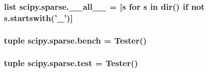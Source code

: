 \subsubsection[{\+\_\+\+\_\+all\+\_\+\+\_\+}]{\setlength{\rightskip}{0pt plus 5cm}list scipy.\+sparse.\+\_\+\+\_\+all\+\_\+\+\_\+ = \mbox{[}{\bf s} for {\bf s} in dir() {\bf if} not s.\+startswith('\+\_\+')\mbox{]}}\label{namespacescipy_1_1sparse_a012f619dd03343fa320a2b36b9710de3}
\hypertarget{namespacescipy_1_1sparse_a5e85f04fbdf989231a00354a0ef449a8}{}
\subsubsection[{bench}]{\setlength{\rightskip}{0pt plus 5cm}tuple scipy.\+sparse.\+bench = Tester()}\label{namespacescipy_1_1sparse_a5e85f04fbdf989231a00354a0ef449a8}
\hypertarget{namespacescipy_1_1sparse_a02160871edc624a6129587f1dbe86093}{}
\subsubsection[{test}]{\setlength{\rightskip}{0pt plus 5cm}tuple scipy.\+sparse.\+test = Tester()}\label{namespacescipy_1_1sparse_a02160871edc624a6129587f1dbe86093}
